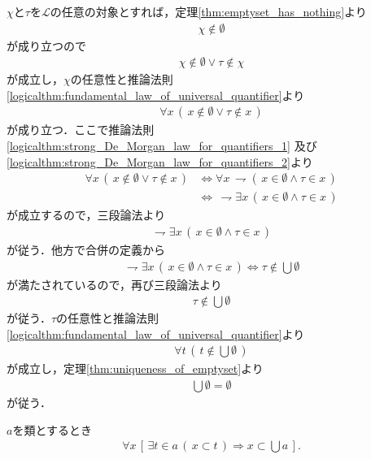 	\begin{prf}
		$\chi$と$\tau$を$\mathcal{L}$の任意の対象とすれば，定理\ref{thm:emptyset_has_nothing}より
		\begin{align}
			\chi \notin \emptyset
		\end{align}
		が成り立つので
		\begin{align}
			\chi \notin \emptyset \vee \tau \notin \chi
		\end{align}
		が成立し，$\chi$の任意性と推論法則\ref{logicalthm:fundamental_law_of_universal_quantifier}より
		\begin{align}
			\forall x\, (\, x \notin \emptyset \vee \tau \notin x\, )
		\end{align}
		が成り立つ．ここで推論法則\ref{logicalthm:strong_De_Morgan_law_for_quantifiers_1}
		及び\ref{logicalthm:strong_De_Morgan_law_for_quantifiers_2}より
		\begin{align}
			\forall x\, (\, x \notin \emptyset \vee \tau \notin x\, )
			&\Longleftrightarrow \forall x\, \rightharpoondown (\, x \in \emptyset \wedge \tau \in x\, ) \\
			&\Longleftrightarrow\, \rightharpoondown \exists x\, (\, x \in \emptyset \wedge \tau \in x\, )
		\end{align}
		が成立するので，三段論法より
		\begin{align}
			\rightharpoondown \exists x\, (\, x \in \emptyset \wedge \tau \in x\, )
		\end{align}
		が従う．他方で合併の定義から
		\begin{align}
			\rightharpoondown \exists x\, (\, x \in \emptyset \wedge \tau \in x\, )
			\Longleftrightarrow \tau \notin \bigcup \emptyset
		\end{align}
		が満たされているので，再び三段論法より
		\begin{align}
			\tau \notin \bigcup \emptyset
		\end{align}
		が従う．$\tau$の任意性と推論法則\ref{logicalthm:fundamental_law_of_universal_quantifier}より
		\begin{align}
			\forall t\, (\, t \notin \bigcup \emptyset\, )
		\end{align}
		が成立し，定理\ref{thm:uniqueness_of_emptyset}より
		\begin{align}
			\bigcup \emptyset = \emptyset
		\end{align}
		が従う．
		\QED
	\end{prf}
	
	\begin{screen}
		\begin{thm}[要素の部分集合は合併の部分集合]\label{thm:union_is_bigger_than_any_member}
			$a$を類とするとき
			\begin{align}
				\forall x\, \left[\, \exists t \in a\, (\, x \subset t\, ) \Longrightarrow x \subset \bigcup a\, \right].
			\end{align}
		\end{thm}
	\end{screen}
	
